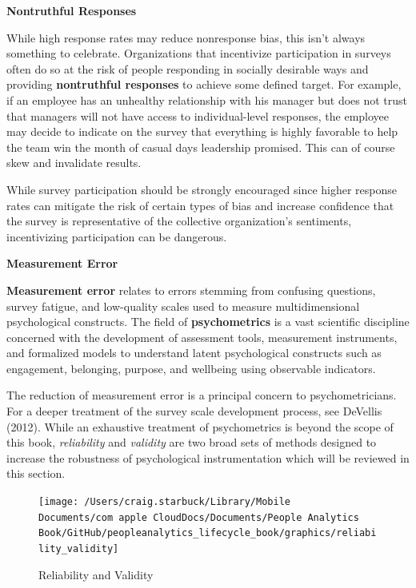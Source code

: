 \documentclass[]{book}
\begin{document}
\textbf{Nontruthful Responses}

While high response rates may reduce nonresponse bias, this isn't always something to celebrate. Organizations that incentivize participation in surveys often do so at the risk of people responding in socially desirable ways and providing \textbf{nontruthful responses} to achieve some defined target. For example, if an employee has an unhealthy relationship with his manager but does not trust that managers will not have access to individual-level responses, the employee may decide to indicate on the survey that everything is highly favorable to help the team win the month of casual days leadership promised. This can of course skew and invalidate results.

While survey participation should be strongly encouraged since higher response rates can mitigate the risk of certain types of bias and increase confidence that the survey is representative of the collective organization's sentiments, incentivizing participation can be dangerous.

\textbf{Measurement Error}

\textbf{Measurement error} relates to errors stemming from confusing questions, survey fatigue, and low-quality scales used to measure multidimensional psychological constructs. The field of \textbf{psychometrics} is a vast scientific discipline concerned with the development of assessment tools, measurement instruments, and formalized models to understand latent psychological constructs such as engagement, belonging, purpose, and wellbeing using observable indicators.

The reduction of measurement error is a principal concern to psychometricians. For a deeper treatment of the survey scale development process, see DeVellis (2012). While an exhaustive treatment of psychometrics is beyond the scope of this book, \emph{reliability} and \emph{validity} are two broad sets of methods designed to increase the robustness of psychological instrumentation which will be reviewed in this section.

\begin{figure}

{\centering \texttt{[image: /Users/craig.starbuck/Library/Mobile Documents/com~apple~CloudDocs/Documents/People Analytics Book/GitHub/peopleanalytics\_lifecycle\_book/graphics/reliability\_validity]} 

}

\caption{Reliability and Validity}\label{fig:reli-vali}
\end{figure}
\end{document}
